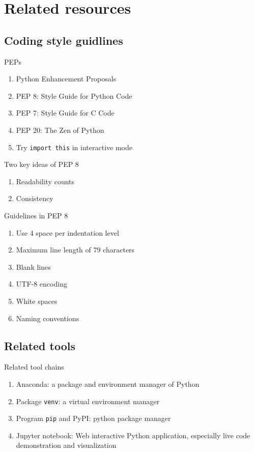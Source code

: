 \documentclass[english, nochinese]{../TeXTemplate/pkuslide}
\begin{document}
\section{Related resources}

\begin{frame}
\sectionpage
\end{frame}

\subsection{Coding style guidlines}

\begin{frame}[fragile]{PEPs}
\begin{enumerate}
\item Python Enhancement Proposals
\item PEP 8: Style Guide for Python Code
\item PEP 7: Style Guide for C Code
\item PEP 20: The Zen of Python
\item Try \verb"import this" in interactive mode
\end{enumerate}
\end{frame}

\begin{frame}{Two key ideas of PEP 8}
\begin{enumerate}
\item Readability counts
\item Consistency
\end{enumerate}
\end{frame}

\begin{frame}{Guidelines in PEP 8}
\begin{enumerate}
\item Use 4 space per indentation level
\item Maximum line length of 79 characters
\item Blank lines
\item UTF-8 encoding
\item White spaces
\item Naming conventions
\end{enumerate}
\end{frame}

\subsection{Related tools}

\begin{frame}[fragile]{Related tool chains}
\begin{enumerate}
\item Anaconda: a package and environment manager of Python
\item Package \verb"venv": a virtual environment manager
\item Program \texttt{pip} and PyPI: python package manager
\item Jupyter notebook: Web interactive Python application, especially live code demonstration and visualization
\end{enumerate}
\end{frame}
\end{document}
